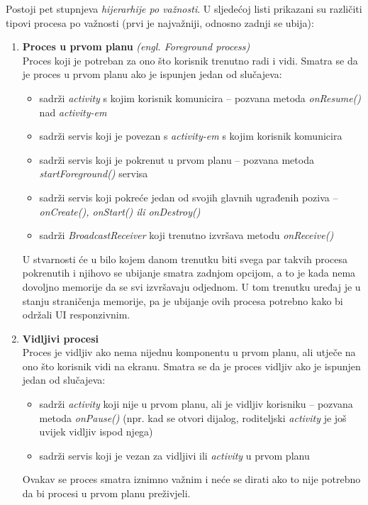 \documentclass[times, utf8, zavrsni]{fer}
\begin{document}
Postoji pet stupnjeva \textit{hijerarhije po važnosti}. U sljedećoj listi prikazani su različiti tipovi procesa po važnosti (prvi je najvažniji, odnosno zadnji se ubija):

\begin{enumerate}
\item
\textbf{Proces u prvom planu} \textit{(engl. Foreground process)}\\
Proces koji je potreban za ono što korisnik trenutno radi i vidi. Smatra se da je proces u prvom planu ako je ispunjen jedan od slučajeva:
	\begin{itemize}
	\item sadrži \textit{activity} s kojim korisnik komunicira – pozvana metoda \textit{onResume()} nad \textit{activity-em}
	\item sadrži servis koji je povezan s \textit{activity-em} s kojim korisnik komunicira
	\item sadrži servis koji je pokrenut u prvom planu – pozvana metoda \textit{startForeground()} servisa
	\item sadrži servis koji pokreće jedan od svojih glavnih ugrađenih poziva – \textit{onCreate(), onStart() ili onDestroy()}
	\item sadrži \textit{BroadcastReceiver} koji trenutno izvršava metodu \textit{onReceive()}
	\end{itemize}
U stvarnosti će  u bilo kojem danom trenutku biti svega par takvih procesa pokrenutih i njihovo se ubijanje smatra zadnjom opcijom, a to je kada nema dovoljno memorije da se svi izvršavaju odjednom. U tom trenutku uređaj je u stanju straničenja memorije, pa je ubijanje ovih procesa potrebno kako bi održali UI responzivnim.	
	
\item
\textbf{Vidljivi procesi}\\
Proces je vidljiv ako nema nijednu komponentu u prvom planu, ali utječe na ono što korisnik vidi na ekranu. Smatra se da je proces vidljiv ako je ispunjen jedan od slučajeva:
	\begin{itemize}
	\item sadrži \textit{activity} koji nije u prvom planu, ali je vidljiv korisniku – pozvana metoda \textit{onPause()} (npr. kad se otvori dijalog, roditeljski \textit{activity} je još uvijek vidljiv ispod njega)
	\item sadrži servis koji je vezan za vidljivi ili \textit{activity} u prvom planu
	\end{itemize}
Ovakav se proces smatra iznimno važnim i neće se dirati ako to nije potrebno da bi procesi u prvom planu preživjeli.


\end{enumerate}
\end{document}
